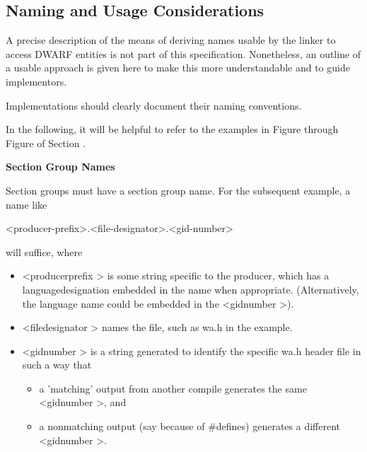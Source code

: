 \subsection{Naming and Usage Considerations}
\label{app:namingandusageconsiderations}

A precise description of the means of deriving names usable
by the linker to access DWARF entities is not part of this
specification. Nonetheless, an outline of a usable approach
is given here to make this more understandable and to guide
implementors.

Implementations should clearly document their naming conventions.

In the following, it will be helpful to refer to the examples
in 
Figure 
through 
Figure 
of 
Section .

\textbf{Section Group Names}

Section groups must have a section group name. For the subsequent 
 example, a name like

<producer-prefix>.<file-designator>.<gid-number>

will suffice, where

\begin{itemize}

\item  \textless producer\dash prefix \textgreater 
is some string specific to the
producer, which has a language\dash designation embedded in the
name when appropriate. (Alternatively, the language name
could be embedded in the 
\textless gid\dash number \textgreater).


\item  \textless file\dash designator \textgreater
names the file, such as wa.h in
the example.


\item  \textless gid\dash number \textgreater
is a string generated to identify the
specific wa.h header file in such a way that

\begin{itemize}

\item  a 'matching' output from another compile generates
the same 
\textless gid\dash number \textgreater,
and

\item  a non\dash matching output (say because of \#defines)
generates a different 
\textless gid\dash number \textgreater.
\end{itemize}

\end{itemize}


